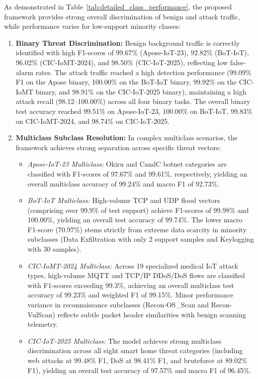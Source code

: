 \documentclass[a4paper,fleqn]{cas-sc}
\begin{document}
{\color{blue}As demonstrated in Table~\ref{tab:detailed_class_performance}, the proposed framework provides strong overall discrimination of benign and attack traffic, while performance varies for low-support minority classes:}
\begin{enumerate}
    \item \textbf{Binary Threat Discrimination:} Benign background traffic is correctly identified with high F1-scores of 99.67\% (Apose-IoT-23), 92.82\% (BoT-IoT), 96.02\% (CIC-IoMT-2024), and 98.50\% (CIC-IoT-2025), reflecting low false-alarm rates. The attack traffic reached a high detection performance (99.09\% F1 on the Apose binary, 100.00\% on the BoT-IoT binary, 99.92\% on the CIC-IoMT binary, and 98.91\% on the CIC-IoT-2025 binary), {\color{blue}maintaining a high attack recall (98.12--100.00\%) across all four binary tasks.} The overall binary test accuracy reached 99.51\% on Apose-IoT-23, 100.00\% on BoT-IoT, 99.83\% on CIC-IoMT-2024, and 98.74\% on CIC-IoT-2025.
    
    \item \textbf{Multiclass Subclass Resolution:} In complex multiclass scenarios, the framework achieves strong separation across specific threat vectors:
    \begin{itemize}
        \item \textit{Apose-IoT-23 Multiclass:} Okiru and CandC botnet categories are classified with F1-scores of 97.67\% and 99.61\%, respectively, yielding an overall multiclass accuracy of 99.24\% and macro F1 of 92.73\%.
        \item \textit{BoT-IoT Multiclass:} High-volume TCP and UDP flood vectors (comprising over 99.9\% of test support) achieve F1-scores of 99.98\% and 100.00\%, yielding an overall test accuracy of 99.74\%. The lower macro F1-score (70.97\%) stems strictly from extreme data scarcity in minority subclasses (Data Exfiltration with only 2 support samples and Keylogging with 30 samples).
        \item \textit{CIC-IoMT-2024 Multiclass:} Across 19 specialized medical IoT attack types, high-volume MQTT and TCP/IP DDoS/DoS flows are classified with F1-scores exceeding 99.3\%, achieving an overall multiclass test accuracy of 99.23\% and weighted F1 of 99.15\%. Minor performance variance in reconnaissance subclasses (Recon-OS\_Scan and Recon-VulScan) reflects subtle packet header similarities with benign scanning telemetry.
        \item \textit{CIC-IoT-2025 Multiclass:} The model achieves strong multiclass discrimination across all eight smart home threat categories (including web attacks at 99.48\% F1, DoS at 98.41\% F1, and bruteforce at 89.02\% F1), yielding an overall test accuracy of 97.57\% and macro F1 of 96.45\%.
    \end{itemize}
\end{enumerate}
\end{document}

